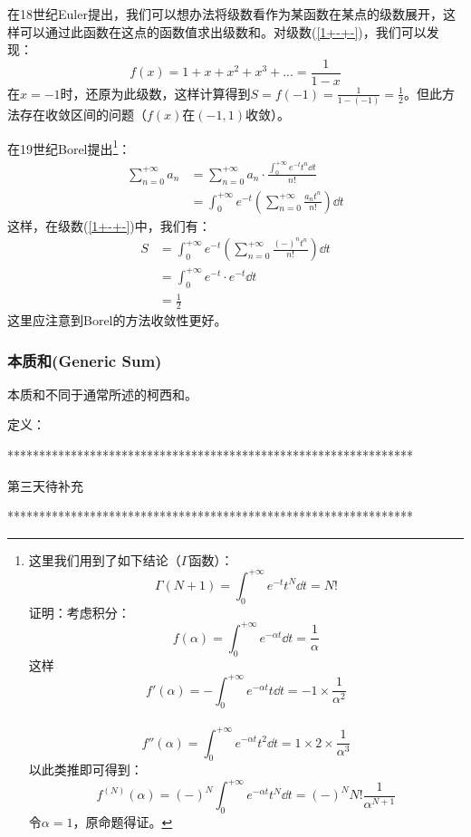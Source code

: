 
在18世纪Euler提出，我们可以想办法将级数看作为某函数在某点的级数展开，这样可以通过此函数在这点的函数值求出级数和。对级数(\ref{1+-+-})，我们可以发现：
\[f(x)=1+x+x^2+x^3+...=\frac{1}{1-x}\]
在\(x=-1\)时，还原为此级数，这样计算得到\(S=f(-1)=\frac{1}{1-(-1)}=\frac{1}{2}\)。但此方法存在收敛区间的问题（\(f(x)\)在\((-1,1)\)收敛）。

在19世纪Borel提出\footnote{
	这里我们用到了如下结论（\(\Gamma\)函数）：
	\[\Gamma(N+1)=\int_0^{+\infty}e^{-t}t^N\dd t=N!\]
	证明：考虑积分： 
	\[f(\alpha)=\int_0^{+\infty}e^{-\alpha t}\dd t=\frac{1}{\alpha}\]
	这样
	\[f'(\alpha)=-\int_0^{+\infty}e^{-\alpha t}t\dd t=-1\times\frac{1}{\alpha^2}\]\\
	\[f''(\alpha)=\int_0^{+\infty}e^{-\alpha t}t^2\dd t=1\times2\times\frac{1}{\alpha^3}\]
	以此类推即可得到：
	\[f^{(N)}(\alpha)=(-)^N\int_0^{+\infty}e^{-\alpha t}t^N\dd t=(-)^N N!\frac{1}{\alpha^{N+1}}\]
	令\(\alpha=1\)，原命题得证。}：
\begin{align*}
	\sum_{n=0}^{+\infty}a_n&=\sum_{n=0}^{+\infty}a_n\cdot\frac{\int_0^{+\infty}e^{-t}t^n\dd t}{n!}\\
	&=\int_0^{+\infty}e^{-t}\left(\sum_{n=0}^{+\infty}\frac{a_n t^n}{n!}\right)\dd t
\end{align*}
这样，在级数(\ref{1+-+-})中，我们有：
\begin{align*}
	S&=\int_0^{+\infty}e^{-t}\left(\sum_{n=0}^{+\infty}\frac{(-)^{n} t^n}{n!}\right)\dd t\\
	&=\int_0^{+\infty}e^{-t}\cdot e^{-t}\dd t\\
	&=\frac{1}{2}
\end{align*}
这里应注意到Borel的方法收敛性更好。

\subsubsection{本质和(Generic Sum)}
本质和不同于通常所述的柯西和。

定义：



\begin{center}
	****************************************************************
	
	
	
	第三天待补充
	
	
	
	
	****************************************************************
	
\end{center}


















